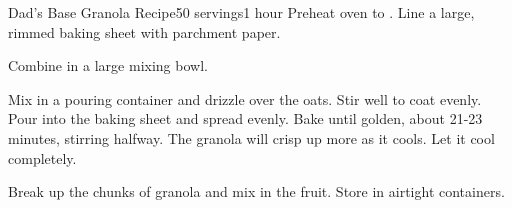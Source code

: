 \documentclass[../Cookbook.tex]{subfiles}
\begin{document}
\begin{recipe}[DadsGranola]{Dad's Base Granola Recipe}{50 servings}{1 hour}
Preheat oven to .
Line a large, rimmed baking sheet with parchment paper.

Combine in a large mixing bowl.

Mix in a pouring container and drizzle over the oats.
Stir well to coat evenly.
Pour into the baking sheet and spread evenly.
Bake until golden, about 21-23 minutes, stirring halfway.
The granola will crisp up more as it cools.
Let it cool completely.

Break up the chunks of granola and mix in the fruit.
Store in airtight containers.
\end{recipe}
\end{document}
